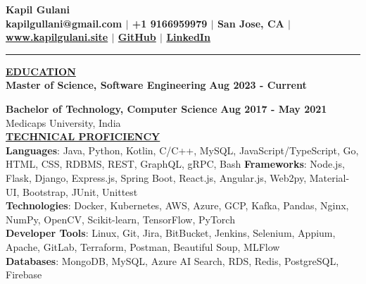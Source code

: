 \documentclass{article}
\begin{document}
\begin{center}
\thispagestyle{empty}
\large \textbf{Kapil Gulani \\}
\normalsize \textbf{kapilgullani@gmail.com $\mid$ +1 9166959979 $\mid$ San Jose, CA  $\mid$ \href{https://kapilgulani.site/}{www.kapilgulani.site} $\mid$ \href{https://github.com/kapilgulani}{GitHub} $\mid$ \href{https://www.linkedin.com/in/kapil-gulani}{LinkedIn} \\}
\rule{\textwidth}{1pt}
\end{center}

\noindent \textbf{\underline{EDUCATION}} \\
\textbf{ Master of Science, Software Engineering } \hfill \textbf{Aug 2023 - Current} \\
\begin{itemize}[noitemsep,nolistsep,leftmargin=*]
\end{itemize}
\begin{itemize}
\end{itemize}
\textbf{Bachelor of Technology, Computer Science} \hfill \hfill \textbf{Aug 2017 - May 2021} \\
Medicaps University, India \\

\noindent \textbf{\underline{TECHNICAL PROFICIENCY}} \\
\textbf{Languages}{: \small Java, Python, Kotlin, C/C++, MySQL, JavaScript/TypeScript, Go, HTML, CSS, RDBMS, REST, GraphQL, gRPC, Bash}
\textbf{Frameworks}{: \small Node.js, Flask, Django, Express.js, Spring Boot, React.js, Angular.js, Web2py, Material-UI, Bootstrap, JUnit, Unittest} \\
\textbf{Technologies}{: \small Docker, Kubernetes, AWS, Azure, GCP, Kafka, Pandas, Nginx, NumPy, OpenCV, Scikit-learn, TensorFlow, PyTorch } \\
\textbf{Developer Tools}{: \small Linux, Git, Jira, BitBucket, Jenkins, Selenium, Appium, Apache, GitLab, Terraform, Postman, Beautiful Soup, MLFlow} \\
\textbf{Databases}{: \small MongoDB, MySQL, Azure AI Search, RDS, Redis, PostgreSQL, Firebase}
\\
\end{document}
